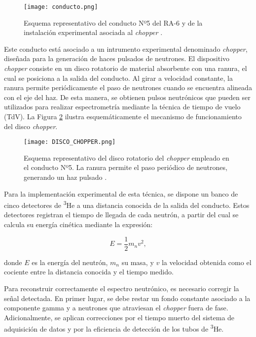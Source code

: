 \begin{figure}[h]
\centering
\texttt{[image: conducto.png]}
\caption{Esquema representativo del conducto Nº5 del RA-6 y de la instalación experimental asociada al \textit{chopper} \cite{DeptoNeutronesCAB2025}.}
\label{fig:conducto}
\end{figure}

Este conducto está asociado a un intrumento experimental denominado \textit{chopper}, diseñada para la generación de haces pulsados de neutrones. El dispositivo \textit{chopper} consiste en un disco rotatorio de material absorbente con una ranura, el cual se posiciona a la salida del conducto. Al girar a velocidad constante, la ranura permite periódicamente el paso de neutrones cuando se encuentra alineada con el eje del haz. De esta manera, se obtienen pulsos neutrónicos que pueden ser utilizados para realizar espectrometría mediante la técnica de tiempo de vuelo (TdV). La Figura \ref{fig:chopper} ilustra esquemáticamente el mecanismo de funcionamiento del disco \textit{chopper}.

\begin{figure}[h]
\centering
\texttt{[image: DISCO\_CHOPPER.png]}
\caption{Esquema representativo del disco rotatorio del \textit{chopper} empleado en el conducto Nº5. La ranura permite el paso periódico de neutrones, generando un haz pulsado \cite{DeptoNeutronesCAB2025}.}
\label{fig:chopper}
\end{figure}

Para la implementación experimental de esta técnica, se dispone un banco de cinco detectores de \textsuperscript{3}He a una distancia conocida de la salida del conducto. Estos detectores registran el tiempo de llegada de cada neutrón, a partir del cual se calcula su energía cinética mediante la expresión:

\begin{equation}
E = \frac{1}{2} m_n v^2,
\end{equation}

donde $E$ es la energía del neutrón, $m_n$ su masa, y $v$ la velocidad obtenida como el cociente entre la distancia conocida y el tiempo medido.

Para reconstruir correctamente el espectro neutrónico, es necesario corregir la señal detectada. En primer lugar, se debe restar un fondo constante asociado a la componente gamma y a neutrones que atraviesan el \textit{chopper} fuera de fase. Adicionalmente, se aplican correcciones por el tiempo muerto del sistema de adquisición de datos y por la eficiencia de detección de los tubos de \textsuperscript{3}He.

